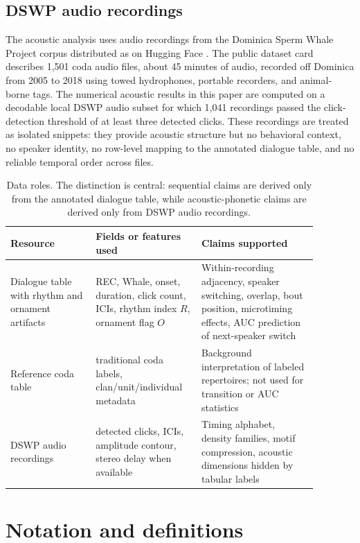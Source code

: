 \documentclass[11pt]{article}
\begin{document}
\subsection{DSWP audio recordings}

The acoustic analysis uses audio recordings from the Dominica Sperm Whale Project corpus distributed as  on Hugging Face \citep{dswpdataset}. The public dataset card describes 1,501 coda audio files, about 45 minutes of audio, recorded off Dominica from 2005 to 2018 using towed hydrophones, portable recorders, and animal-borne tags. The numerical acoustic results in this paper are computed on a decodable local DSWP audio subset for which 1,041 recordings passed the click-detection threshold of at least three detected clicks. These recordings are treated as isolated snippets: they provide acoustic structure but no behavioral context, no speaker identity, no row-level mapping to the annotated dialogue table, and no reliable temporal order across files.

\begin{table}[H]
\centering
\caption{Data roles. The distinction is central: sequential claims are derived only from the annotated dialogue table, while acoustic-phonetic claims are derived only from DSWP audio recordings.}
\label{tab:data_roles}
\begin{tabular}{P{0.25\linewidth}P{0.29\linewidth}P{0.34\linewidth}}
\toprule
Resource & Fields or features used & Claims supported \\
\midrule
Dialogue table with rhythm and ornament artifacts & REC, Whale, onset, duration, click count, ICIs, rhythm index $R$, ornament flag $O$ & Within-recording adjacency, speaker switching, overlap, bout position, microtiming effects, AUC prediction of next-speaker switch \\
\addlinespace
Reference coda table & traditional coda labels, clan/unit/individual metadata & Background interpretation of labeled repertoires; not used for transition or AUC statistics \\
\addlinespace
DSWP audio recordings & detected clicks, ICIs, amplitude contour, stereo delay when available & Timing alphabet, density families, motif compression, acoustic dimensions hidden by tabular labels \\
\bottomrule
\end{tabular}
\end{table}

\section{Notation and definitions}
\end{document}

